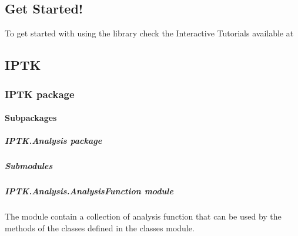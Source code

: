 \documentclass[letterpaper,10pt,english]{sphinxmanual}
\begin{document}
\subsection{Get Started!}
\label{\detokenize{get_started:get-started}}\label{\detokenize{get_started::doc}}
To get started with using the library check the Interactive Tutorials available at 


\subsection{IPTK}
\label{\detokenize{modules:iptk}}\label{\detokenize{modules::doc}}

\subsubsection{IPTK package}
\label{\detokenize{IPTK:iptk-package}}\label{\detokenize{IPTK::doc}}

\paragraph{Subpackages}
\label{\detokenize{IPTK:subpackages}}

\subparagraph{IPTK.Analysis package}
\label{\detokenize{IPTK.Analysis:iptk-analysis-package}}\label{\detokenize{IPTK.Analysis::doc}}

\subparagraph{Submodules}
\label{\detokenize{IPTK.Analysis:submodules}}

\subparagraph{IPTK.Analysis.AnalysisFunction module}
\label{\detokenize{IPTK.Analysis:module-IPTK.Analysis.AnalysisFunction}}\label{\detokenize{IPTK.Analysis:iptk-analysis-analysisfunction-module}}
The module contain a collection of analysis function that can be used by the methods of
the classes defined in the classes module.
\end{document}

